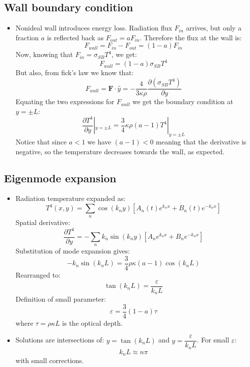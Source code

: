 \documentclass{article}
\begin{document}
\subsection*{Wall boundary condition}
\begin{itemize}
    \item Nonideal wall introduces energy loss. Radiation flux $F_{in}$ arrives, but only a fraction $a$ is reflected back as $F_{out} = a F_{in}$. Therefore the flux at the wall is:
    \begin{equation*}
    F_{wall} = F_{in} - F_{out} = (1-a) F_{in}
    \end{equation*}
    Now, knowing that $F_{in} = \sigma_{SB} T^4$, we get:
    \begin{equation*}
    F_{wall} = (1-a) \sigma_{SB} T^4
    \end{equation*}
    But also, from fick's law we know that:
    \begin{equation*}
    F_{wall} = \boldsymbol{F} \cdot \hat{y} = -\frac{4}{3\kappa\rho} \frac{\partial (\sigma_{SB} T^4)}{\partial y}
    \end{equation*}
    Equating the two expressions for $F_{wall}$ we get the boundary condition at $y=\pm L$:
    \begin{equation}
    \frac{\partial T^4}{\partial y}|_{y=\pm L} = \frac{3}{4} \kappa \rho (a-1) T^4|_{y=\pm L}
    \end{equation}
    Notice that since $a<1$ we have $(a-1)<0$ meaning that the derivative is negative, so the temperature decreases towards the wall, as expected.
\end{itemize}

\subsection*{Eigenmode expansion}
\begin{itemize}
    \item Radiation temperature expanded as:
    \[
    T^4(x,y) = \sum_n \cos(k_n y)\left[A_n(t)e^{k_n x} + B_n(t)e^{-k_n x}\right]
    \]
    Spatial derivative:
    \[
    \frac{\partial T^4}{\partial y} 
    = - \sum_n k_n \sin(k_n y)\left[A_n e^{k_n x} + B_n e^{-k_n x}\right]
    \]
    Substitution of mode expansion gives:
    \[
    - k_n \sin(k_n L) = \frac{3}{4}\rho\kappa (a-1)\cos(k_n L)
    \]
    Rearranged to:
    \begin{equation}
    \tan(k_n L) = \frac{\varepsilon}{k_n L}
    \end{equation}
    Definition of small parameter:
    \[
    \varepsilon = \frac{3}{4}(1-a)\tau
    \]
    where $\tau = \rho\kappa L$ is the optical depth.

    \item Solutions are intersections of: $y = \tan(k_n L)$ and $y = \dfrac{\varepsilon}{k_n L}$. For small $\varepsilon$:
    \[
    k_n L \approx n\pi
    \]
    with small corrections.
    \end{itemize}
\end{document}
